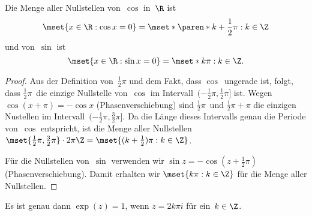 \documentclass[a4paper]{article}
\begin{document}
\begin{theorem}[Nullstellen in~$\R$]
    Die Menge aller Nullstellen von~$\cos$ in~$\R$ ist
    \begin{equation*}
        \mset{x \in \R : \cos x = 0} = \mset*{\paren*{k+\frac{1}{2}}\pi : k \in \Z}
    \end{equation*}
    und von~$\sin$ ist
    \begin{equation*}
        \mset{x \in \R : \sin x = 0} = \mset*{k\pi : k \in \Z}.
    \end{equation*}
\end{theorem}

\begin{proof}
    Aus der Definition von~$\frac{1}{2}\pi$ und dem Fakt, dass $\cos$~ungerade ist, folgt, dass $\frac{1}{2}\pi$~die einzige Nullstelle von~$\cos$ im Intervall~$(-\frac{1}{2}\pi, \frac{1}{2}\pi]$ ist. Wegen $\cos(x+\pi) = -\cos x$ (Phasenverschiebung) sind $\frac{1}{2}\pi$~und $\frac{1}{2}\pi+\pi$ die einzigen Nustellen im Intervall~$(-\frac{1}{2}\pi, \frac{3}{2}\pi]$. Da die Länge dieses Intervalls genau die Periode von~$\cos$ entspricht, ist die Menge aller Nullstellen $\mset{\frac{1}{2}\pi, \frac{3}{2}\pi} \cdot 2\pi\Z = \mset{(k+\frac{1}{2})\pi : k \in \Z}$.

    Für die Nullstellen von~$\sin$ verwenden wir $\sin z = -\cos(z+\frac{1}{2}\pi)$ (Phasenverschiebung). Damit erhalten wir $\mset{k\pi : k \in \Z}$ für die Menge aller Nullstellen.
\end{proof}

\begin{corollary}\label{cor:complex:exp1}
    Es ist genau dann $\exp(z) = 1$, wenn $z = 2k\pi i$ für ein~$k \in \Z$.
\end{corollary}
\end{document}
